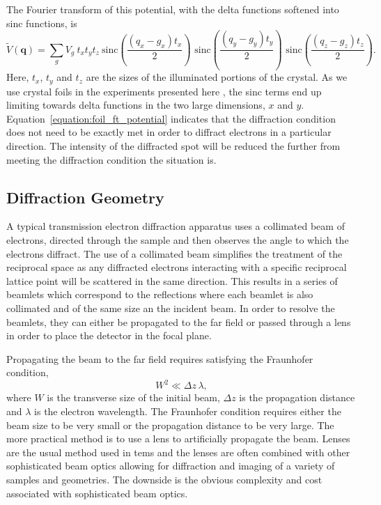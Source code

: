 The Fourier transform of this potential, with the delta functions softened into sinc functions, is
\begin{equation}\label{equation:foil_ft_potential}
\tilde{V}(\mathbf{q}) = \sum_g V_g \: t_x  t_y  t_z \: \text{sinc}{\left( \frac{(q_x-g_x)t_x}{2} \right)} \,\, \text{sinc}{\left( \frac{(q_y-g_y)t_y}{2} \right)} \,\, \text{sinc}{\left( \frac{(q_z-g_z)t_z}{2} \right)}.
\end{equation}
Here, $t_x$, $t_y$ and $t_z$ are the sizes of the illuminated portions of the crystal.
As we use crystal foils in the experiments presented here , the sinc terms end up limiting towards delta functions in the two large dimensions, $x$ and $y$.
Equation~\ref{equation:foil_ft_potential} indicates that the diffraction condition does not need to be exactly met in order to diffract electrons in a particular direction.
The intensity of the diffracted spot will be reduced the further from meeting the diffraction condition the situation is.

\subsection{Diffraction Geometry}

A typical transmission electron diffraction apparatus uses a collimated beam of electrons, directed through the sample and then observes the angle to which the electrons diffract.
The use of a collimated beam simplifies the treatment of the reciprocal space as any diffracted electrons interacting with a specific reciprocal lattice point will be scattered in the same direction.
This results in a series of beamlets which correspond to the reflections where each beamlet is also collimated and of the same size an the incident beam.
In order to resolve the beamlets, they can either be propagated to the far field or passed through a lens in order to place the detector in the focal plane.

Propagating the beam to the far field requires satisfying the Fraunhofer condition,
\begin{equation}
W^2 \ll \Delta z\,\lambda,
\end{equation}
where $W$ is the transverse size of the initial beam, $\Delta z$ is the propagation distance and $\lambda$ is the electron wavelength.
The Fraunhofer condition requires either the beam size to be very small or the propagation distance to be very large.
The more practical method is to use a lens to artificially propagate the beam.
Lenses are the usual method used in \glspl{tem} and the lenses are often combined with other sophisticated beam optics allowing for diffraction and imaging of a variety of samples and geometries.
The downside is the obvious complexity and cost associated with sophisticated beam optics.

